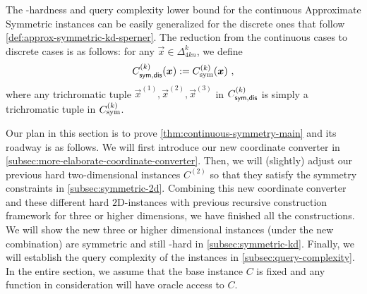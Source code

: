 \begin{remark}
    The \PPAD-hardness and query complexity lower bound for the continuous \outofk Approximate Symmetric \Sperner instances can be easily generalized for the discrete ones that follow \cref{def:approx-symmetric-kd-sperner}.
    The reduction from the continuous cases to discrete cases is as follows: for any $\vec{x}\in \Delta_{4kn}^{k}$, we define 
    \begin{align*}
        C^{(k)}_{\sf sym,dis}(\boldsymbol{x}) := C_{\rm sym}^{(k)}(\boldsymbol{x})~,
    \end{align*}
    where any trichromatic tuple $\vec{x}^{(1)}, \vec{x}^{(2)}, \vec{x}^{(3)}$ in $C^{(k)}_{\sf sym,dis}$ is 
    simply a trichromatic tuple in $C_{\rm sym}^{(k)}$. 
\end{remark}

Our plan in this section is to prove \cref{thm:continuous-symmetry-main} and its roadway is as follows. 
We will first introduce our new coordinate converter in \cref{subsec:more-elaborate-coordinate-converter}. 
Then, we will (slightly) adjust our previous hard two-dimensional instances $C^{(2)}$ so that they satisfy the symmetry constraints in \cref{subsec:symmetric-2d}.
Combining this new coordinate converter and these different hard $2${\rm D}-\Sperner instances with previous recursive construction framework for three or higher dimensions, we have finished all the constructions.
We will show the new three or higher dimensional instances (under the new combination) are symmetric and still \PPAD-hard in \cref{subsec:symmetric-kd}.
Finally, we will establish the query complexity of the instances in \cref{subsec:query-complexity}.
In the entire section, we assume that the base instance $C$ is fixed and any function in consideration will have oracle access to $C$.

